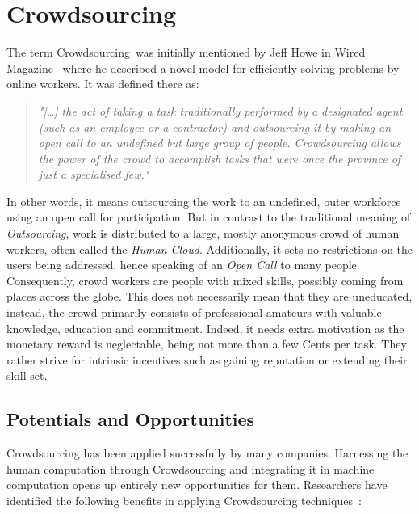 
\section{Crowdsourcing}\label{sec:state_of_the_art_crowdsourcing}
The term \guillemotright Crowdsourcing\guillemotleft~was initially mentioned by Jeff Howe in Wired Magazine~\cite{howe2006} where he described a novel model for efficiently solving problems by online workers. It was defined there as:
\begin{quotation}
	\textit{"[\ldots] the act of taking a task traditionally performed by a designated agent (such as an employee or a contractor) and outsourcing it by making an open call to an undefined but large group of people.  Crowdsourcing allows the power of the crowd to accomplish tasks that were once the province of just a specialised few."}\cite{howe2008}
\end{quotation}
In other words, it means outsourcing the work to an undefined, outer workforce using an open call for participation. But in contrast to the traditional meaning of \emph{Outsourcing}, work is distributed to a large, mostly anonymous crowd of human workers, often called the \emph{Human Cloud}. Additionally, it sets no restrictions on the users being addressed, hence speaking of an \emph{Open Call} to many people. Consequently, crowd workers are people with mixed skills, possibly coming from places across the globe. This does not necessarily mean that they are uneducated, instead, the crowd primarily consists of professional amateurs with valuable knowledge, education and commitment. Indeed, it needs extra motivation as the monetary reward is neglectable, being not more than a few Cents per task. They rather strive for intrinsic incentives such as gaining reputation or extending their skill set. 

\subsection{Potentials and Opportunities}
Crowdsourcing has been applied successfully by many companies. Harnessing the human computation through Crowdsourcing and integrating it in machine computation opens up entirely new opportunities for them. Researchers have identified the following benefits in applying Crowdsourcing techniques~\cite{schenk2012}:

